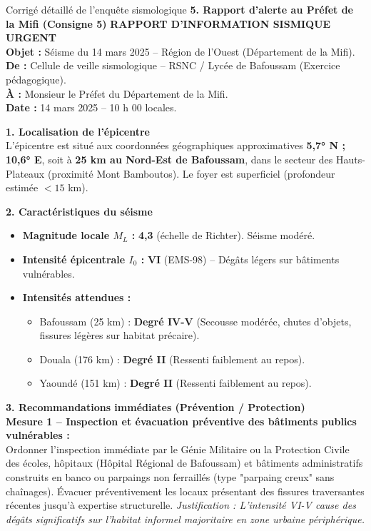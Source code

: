 \documentclass[11pt]{article}
\begin{document}
\begin{exoresolu}{Corrigé détaillé de l'enquête sismologique}
\medskip
\textbf{5. Rapport d'alerte au Préfet de la Mifi (Consigne 5)}
\medskip
\noindent\textbf{RAPPORT D'INFORMATION SISMIQUE URGENT}\\
\textbf{Objet :} Séisme du 14 mars 2025 – Région de l'Ouest (Département de la Mifi).\\
\textbf{De :} Cellule de veille sismologique – RSNC / Lycée de Bafoussam (Exercice pédagogique).\\
\textbf{À :} Monsieur le Préfet du Département de la Mifi.\\
\textbf{Date :} 14 mars 2025 – 10 h 00 locales.

\medskip
\noindent\textbf{1. Localisation de l'épicentre}\\
L'épicentre est situé aux coordonnées géographiques approximatives \textbf{5,7° N ; 10,6° E}, soit à \textbf{25 km au Nord-Est de Bafoussam}, dans le secteur des Hauts-Plateaux (proximité Mont Bamboutos). Le foyer est superficiel (profondeur estimée $< 15$ km).

\medskip
\noindent\textbf{2. Caractéristiques du séisme}\\
\begin{itemize}
    \item \textbf{Magnitude locale $M_L$ :} \textbf{4,3} (échelle de Richter). Séisme modéré.
    \item \textbf{Intensité épicentrale $I_0$ :} \textbf{VI} (EMS-98) – Dégâts légers sur bâtiments vulnérables.
    \item \textbf{Intensités attendues :}
    \begin{itemize}
        \item Bafoussam (25 km) : \textbf{Degré IV-V} (Secousse modérée, chutes d'objets, fissures légères sur habitat précaire).
        \item Douala (176 km) : \textbf{Degré II} (Ressenti faiblement au repos).
        \item Yaoundé (151 km) : \textbf{Degré II} (Ressenti faiblement au repos).
    \end{itemize}
\end{itemize}

\medskip
\noindent\textbf{3. Recommandations immédiates (Prévention / Protection)}\\
\noindent\textbf{Mesure 1 – Inspection et évacuation préventive des bâtiments publics vulnérables :}\\
Ordonner l'inspection immédiate par le Génie Militaire ou la Protection Civile des écoles, hôpitaux (Hôpital Régional de Bafoussam) et bâtiments administratifs construits en banco ou parpaings non ferraillés (type "parpaing creux" sans chaînages). Évacuer préventivement les locaux présentant des fissures traversantes récentes jusqu'à expertise structurelle. \textit{Justification : L'intensité VI-V cause des dégâts significatifs sur l'habitat informel majoritaire en zone urbaine périphérique.}


\end{exoresolu}
\end{document}
